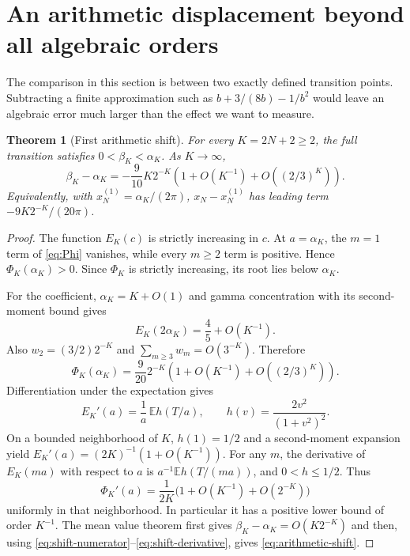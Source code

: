 \documentclass[11pt]{article}
\numberwithin{equation}{section}
\newtheorem{theorem}{Theorem}[section]
\theoremstyle{definition}
\theoremstyle{remark}
\newcommand{\E}{\mathbb E}
\begin{document}
\section{An arithmetic displacement beyond all algebraic orders}
\label{sec:arithmetic}

The comparison in this section is between two exactly defined
transition points. Subtracting a finite approximation such as
$b+3/(8b)-1/b^2$ would leave an algebraic error much larger than
the effect we want to measure.

\begin{theorem}[First arithmetic shift]\label{thm:arithmetic-shift}
For every $K=2N+2\ge2$, the full transition satisfies
$0<\beta_K<\alpha_K$. As $K\to\infty$,
\begin{equation}\label{eq:arithmetic-shift}
 \boxed{\displaystyle
 \beta_K-\alpha_K
 =-\frac9{10}K2^{-K}
  \left(1+O(K^{-1})+O((2/3)^K)\right).}
\end{equation}
Equivalently, with $x_N^{(1)}=\alpha_K/(2\pi)$,
$x_N-x_N^{(1)}$ has leading term $-9K2^{-K}/(20\pi)$.
\end{theorem}
\begin{proof}
The function $E_K(c)$ is strictly increasing in $c$. At
$a=\alpha_K$, the $m=1$ term of \eqref{eq:Phi} vanishes, while
every $m\ge2$ term is positive. Hence $\Phi_K(\alpha_K)>0$.
Since $\Phi_K$ is strictly increasing, its root lies below $\alpha_K$.

For the coefficient, $\alpha_K=K+O(1)$ and gamma concentration
with its second-moment bound gives
\[
 E_K(2\alpha_K)=\frac45+O(K^{-1}).
\]
Also $w_2=(3/2)2^{-K}$ and $\sum_{m\ge3}w_m=O(3^{-K})$.
Therefore
\begin{equation}\label{eq:shift-numerator}
 \Phi_K(\alpha_K)
 =\frac9{20}2^{-K}
   \left(1+O(K^{-1})+O((2/3)^K)\right).
\end{equation}
Differentiation under the expectation gives
\[
 E_K'(a)=\frac1a\,\E h(T/a),\qquad
 h(v)=\frac{2v^2}{(1+v^2)^2}.
\]
On a bounded neighborhood of $K$, $h(1)=1/2$ and a
second-moment expansion yield
$E_K'(a)=(2K)^{-1}(1+O(K^{-1}))$.
For any $m$, the derivative of $E_K(ma)$ with respect to $a$ is
$a^{-1}\E h(T/(ma))$, and $0<h\le1/2$. Thus
\begin{equation}\label{eq:shift-derivative}
 \Phi_K'(a)=\frac1{2K}\bigl(1+O(K^{-1})+O(2^{-K})\bigr)
\end{equation}
uniformly in that neighborhood. In particular it has a positive
lower bound of order $K^{-1}$. The mean value theorem first gives
$\beta_K-\alpha_K=O(K2^{-K})$ and then, using
\eqref{eq:shift-numerator}--\eqref{eq:shift-derivative}, gives
\eqref{eq:arithmetic-shift}.
\end{proof}
\end{document}
